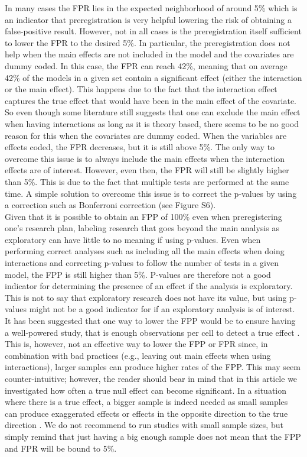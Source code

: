 In many cases the FPR lies in the expected neighborhood of around 5\% which is an indicator that preregistration is very helpful lowering the risk of obtaining a false-positive result. However, not in all cases is the preregistration itself sufficient to lower the FPR to the desired 5\%. In particular, the preregistration does not help when the main effects are not included in the model and the covariates are dummy coded. In this case, the FPR can reach 42\%, meaning that on average 42\% of the models in a given set contain a significant effect (either the interaction or the main effect). This happens due to the fact that the interaction effect captures the true effect that would have been in the main effect of the covariate. So even though some literature still suggests that one can exclude the main effect when having interactions as long as it is theory based, there seems to be no good reason for this when the covariates are dummy coded. When the variables are effects coded, the FPR decreases, but it is still above 5\%. The only way to overcome this issue is to always include the main effects when the interaction effects are of interest. However, even then, the FPR will still be slightly higher than 5\%. This is due to the fact that multiple tests are performed at the same time. A simple solution to overcome this issue is to correct the p-values by  using a correction such as Bonferroni correction \citep{dunn1961multiple} (see Figure S6).
 \\

Given that it is possible to obtain an FPP of 100\% even when preregistering one's research plan, labeling research that goes beyond the main analysis as exploratory can have little to no meaning if using p-values. Even when performing correct analyses such as including all the main effects when doing interactions and correcting p-values to follow the number of tests in a given model, the FPP is still higher than 5\%. P-values are therefore not a good indicator for determining the presence of an effect if the analysis is exploratory. This is not to say that exploratory research does not have its value, but using p-values might not be a good indicator for if an exploratory analysis is of interest. \\
    
It has been suggested that one way to lower the FPP would be to ensure having a well-powered study, that is enough observations per cell to detect a true effect \citep{Simmons2011, simmons2018}. This is, however, not an effective way to lower the FPP or FPR since, in combination with bad practices (e.g., leaving out main effects when using interactions), larger samples can produce higher rates of the FPP. This may seem counter-intuitive; however, the reader should bear in mind that in this article we investigated how often a true null effect can become significant. In a situation where there is a true effect, a bigger sample is indeed needed as small samples can produce exaggerated effects or effects in the opposite direction to the true direction \citep{gelman2014beyond}. We do not recommend to run studies with small sample sizes, but simply remind that just having a big enough sample does not mean that the FPP and FPR will be bound to 5\%.\\

